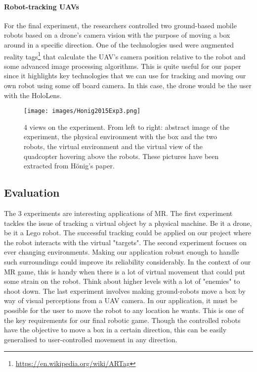 \newpage
\paragraph{Robot-tracking UAVs}
For the final experiment, the researchers controlled two ground-based mobile robots based on a drone's camera vision with the purpose of moving a box around in a specific direction. One of the technologies used were augmented reality tags\footnote{\protect\url{https://en.wikipedia.org/wiki/ARTag}} that calculate the UAV's camera position relative to the robot and some advanced image processing algorithms. This is quite useful for our paper since it highlights key technologies that we can use for tracking and moving our own robot using some off board camera. In this case, the drone would be the user with the HoloLens.
\begin{figure}[!htb]
	\texttt{[image: images/Honig2015Exp3.png]}
	\centering
	\caption{4 views on the experiment. From left to right: abstract image of the experiment, the physical environment with the box and the two robots, the virtual environment and the virtual view of the quadcopter hovering above the robots. These pictures have been extracted from H\"{o}nig's paper\cite{hoenig2015mixed}.}
\end{figure}

\subsection{Evaluation}
The 3 experiments are interesting applications of MR. The first experiment tackles the issue of tracking a virtual object by a physical machine. Be it a drone, be it a Lego robot. The successful tracking could be applied on our project where the robot interacts with the virtual "targets".\newline
The second experiment focuses on ever changing environments. Making our application robust enough to handle such surroundings could improve its reliability considerably. In the context of our MR game, this is handy when there is a lot of virtual movement that could put some strain on the robot. Think about higher levels with a lot of "enemies" to shoot down.\newline
The last experiment involves making ground-robots move a box by way of visual perceptions from a UAV camera. In our application, it must be possible for the user to move the robot to any location he wants. This is one of the key requirements for our final robotic game. Though the controlled robots have the objective to move a box in a certain direction, this can be easily generalised to user-controlled movement in any direction.

